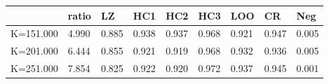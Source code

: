 \begin{table}[ht]
\centering
\begin{tabular}{rllllllll}
  \hline
 & ratio & LZ & HC1 & HC2 & HC3 & LOO & CR & Neg \\ 
  \hline
K=151.000 & 4.990 & 0.885 & 0.938 & 0.937 & 0.968 & 0.921 & 0.947 & 0.005 \\ 
  K=201.000 & 6.444 & 0.855 & 0.921 & 0.919 & 0.968 & 0.932 & 0.936 & 0.005 \\ 
  K=251.000 & 7.854 & 0.825 & 0.922 & 0.920 & 0.972 & 0.937 & 0.945 & 0.001 \\ 
   \hline
\end{tabular}
\end{table}
